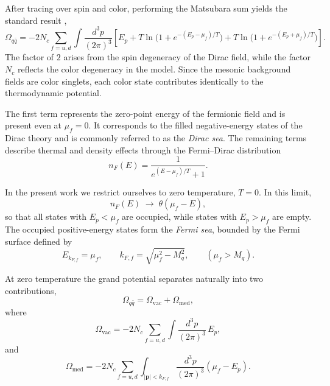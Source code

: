 After tracing over spin and color, performing the Matsubara sum yields
the standard result
\cite{KapustaGale},
\begin{equation}
\Omega_{q\bar q}
=
-2 N_c \sum_{f=u,d}
\int \frac{d^3 p}{(2\pi)^3}
\left[
E_p
+
T \ln\!\big(1+e^{-(E_p-\mu_f)/T}\big)
+
T \ln\!\big(1+e^{-(E_p+\mu_f)/T}\big)
\right].
\label{eq:Omega_after_sum}
\end{equation}
The factor of $2$ arises from the spin degeneracy of the Dirac field,
while the factor $N_c$ reflects the color degeneracy in the model.
Since the mesonic background fields are color singlets, each color
state contributes identically to the thermodynamic potential.

The first term represents the zero-point energy of the fermionic
field and is present even at $\mu_f=0$.
It corresponds to the filled negative-energy states of the Dirac
theory and is commonly referred to as the \emph{Dirac sea}.
The remaining terms describe thermal and density effects through
the Fermi–Dirac distribution
\begin{equation}
n_F(E) = \frac{1}{e^{(E-\mu_f)/T}+1}.
\end{equation}

In the present work we restrict ourselves to zero temperature,
$T=0$.
In this limit,
\begin{equation}
n_F(E)
\;\longrightarrow\;
\theta(\mu_f - E),
\end{equation}
so that all states with $E_p < \mu_f$ are occupied,
while states with $E_p > \mu_f$ are empty.
The occupied positive-energy states form the \emph{Fermi sea},
bounded by the Fermi surface defined by
\cite{KapustaGale,LaineVuorinen}
\begin{equation}
E_{k_{F,f}} = \mu_f,
\qquad
k_{F,f} = \sqrt{\mu_f^2 - M_q^2},
\qquad (\mu_f > M_q).
\end{equation}

At zero temperature the grand potential separates naturally into
two contributions,
\begin{equation}
\Omega_{q\bar q}
=
\Omega_{\text{vac}}
+
\Omega_{\text{med}},
\end{equation}
where
\begin{equation}
\Omega_{\text{vac}}
=
-2 N_c \sum_{f=u,d}
\int \frac{d^3 p}{(2\pi)^3}\,E_p,
\label{eq:vacuum_contribution}
\end{equation}
and
\begin{equation}
\Omega_{\text{med}}
=
-2 N_c \sum_{f=u,d}
\int_{|\mathbf{p}|<k_{F,f}}
\frac{d^3 p}{(2\pi)^3}
(\mu_f - E_p).
\end{equation}

